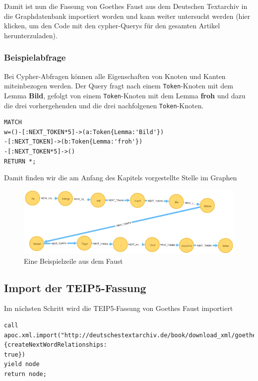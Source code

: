 \documentclass[12pt,ngerman,]{article}
\begin{document}
Damit ist nun die Fassung von Goethes Faust aus dem Deutschen Textarchiv
in die Graphdatenbank importiert worden und kann weiter untersucht
werden (hier klicken, um den Code mit den cypher-Querys für den gesamten
Artikel herunterzuladen).

\subsubsection{Beispielabfrage}\label{beispielabfrage}

Bei Cypher-Abfragen können alle Eigenschaften von Knoten und Kanten
miteinbezogen werden. Der Query fragt nach einem \texttt{Token}-Knoten
mit dem Lemma \textbf{Bild}, gefolgt von einem \texttt{Token}-Knoten mit
dem Lemma \textbf{froh} und dazu die drei vorhergehenden und die drei
nachfolgenen \texttt{Token}-Knoten.

\begin{verbatim}
MATCH
w=()-[:NEXT_TOKEN*5]->(a:Token{Lemma:'Bild'})
-[:NEXT_TOKEN]->(b:Token{Lemma:'froh'})
-[:NEXT_TOKEN*5]->()
RETURN *;
\end{verbatim}

Damit finden wir die am Anfang des Kapitels vorgestellte Stelle im
Graphen

\begin{figure}
\centering
\includegraphics{Bilder/TEI2Graph/BilderFroherTage.png}
\caption{Eine Beispielzeile aus dem Faust}
\end{figure}

\subsection{Import der TEIP5-Fassung}\label{import-der-teip5-fassung}

Im nächsten Schritt wird die TEIP5-Fassung von Goethes Faust importiert

\begin{verbatim}
call
apoc.xml.import("http://deutschestextarchiv.de/book/download_xml/goethe_faust01_1808",{createNextWordRelationships:
true})
yield node
return node;
\end{verbatim}
\end{document}
